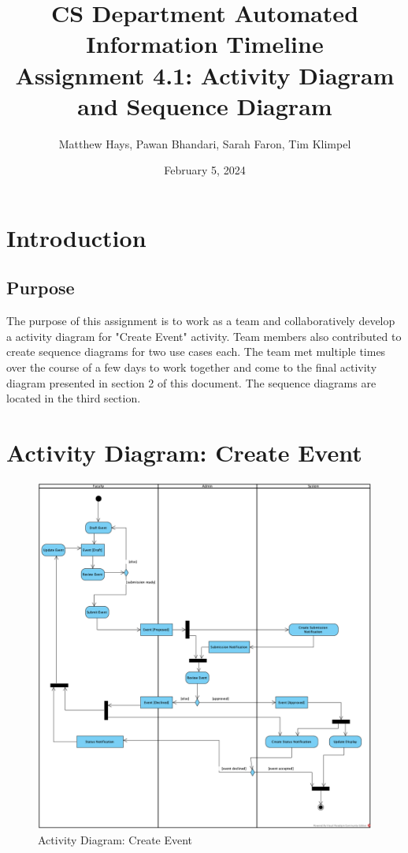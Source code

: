 \documentclass{article}
\title{CS Department Automated Information Timeline \\ Assignment 4.1: Activity Diagram and Sequence Diagram}
\date{February 5, 2024}
\author{Matthew Hays, Pawan Bhandari, Sarah Faron, Tim Klimpel}
\begin{document}
\maketitle
\newpage
\tableofcontents
\listoffigures
\newpage

\section{Introduction}
\subsection{Purpose}
The purpose of this assignment is to work as a team and collaboratively develop a activity diagram for "Create Event" activity. Team members also contributed to create sequence diagrams for two use cases each. The team met multiple times over the course of a few days to work together and come to the final activity diagram presented in section 2 of this document. The sequence diagrams are located in the third section.

\section{Activity Diagram: Create Event}
\begin{figure}[H]
    \centering
    \includegraphics[width=.98\textwidth]{images/SubmitEvent.png}
    \centering
    \caption{Activity Diagram: Create Event}
    \label{fig:activityDiagram}
\end{figure}
\end{document}
